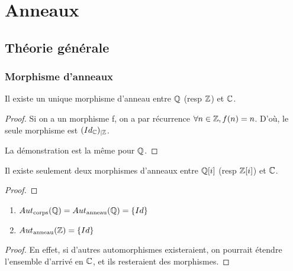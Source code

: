 \chapter{Anneaux}

\section{Théorie générale}

\subsection{Morphisme d'anneaux}
\begin{proposition}
	Il existe un unique morphisme d'anneau entre $\mathbb{Q}$ (resp $\mathbb{Z}$)
	et $\mathbb{C}$.
\end{proposition}

\ifdefined\outputproof
\begin{proof}
	Si on a un morphisme f, on a par récurrence $\forall n \in \mathbb{Z}, f(n) =
	n$. D'où, le seule morphisme est $({Id_{\mathbb{C}}})_{|\mathbb{Z}}$.

	La démonstration est la même pour $\mathbb{Q}$.
\end{proof}
\fi

\begin{proposition}
	Il existe seulement deux morphismes d'anneaux entre $\mathbb{Q}[i]$ (resp
	$\mathbb{Z}[i]$) et $\mathbb{C}$.
\end{proposition}

\ifdefined\outputproof
\begin{proof}

\end{proof}
\fi

\begin{corollary}
	\begin{enumerate}
		\item $Aut_{\text{corps}}(\mathbb{Q}) =
			Aut_{\text{anneau}}(\mathbb{Q}) = \left\{Id \right\}$
		\item $Aut_{\text{anneau}}(\mathbb{Z}) = \left\{Id \right\}$
	\end{enumerate}
\end{corollary}

\ifdefined\outputproof
\begin{proof}
	En effet, si d'autres automorphismes existeraient, on pourrait étendre
	l'ensemble d'arrivé en $\mathbb{C}$, et ils resteraient des morphismes.
\end{proof}
\fi

